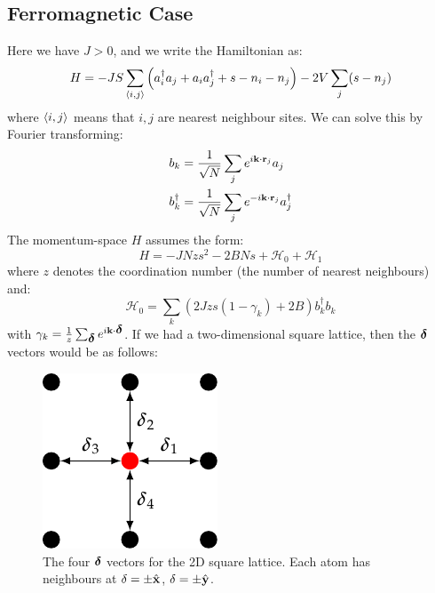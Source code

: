 \subsection{Ferromagnetic Case}
Here we have $J > 0$, and we write the Hamiltonian as:
\begin{equation}
    H = -JS\sum_{\left< i, j \right>}\left(a_i^\dagger a_j + a_i a_j^\dagger + s - n_i - n_j\right) - 2V\sum_j (s - n_j)
\end{equation}
where $\left< i, j \right>$ means that $i, j$ are nearest neighbour sites. We can solve this by Fourier transforming:
\begin{equation}
    \begin{split}
        b_k &= \frac{1}{\sqrt{N}}\sum_j e^{i\mathbf{k}\cdot \mathbf{r}_j}a_j
        \\ b_k^\dagger &= \frac{1}{\sqrt{N}}\sum_j e^{-i\mathbf{k}\cdot \mathbf{r}_j}a_j^\dagger
    \end{split}
\end{equation}
The momentum-space $H$ assumes the form:
\begin{equation}
    H = -JNzs^2 - 2BNs + \mathcal{H}_0 + \mathcal{H}_1
\end{equation}
where $z$ denotes the coordination number (the number of nearest neighbours) and:
\begin{equation}
    \mathcal{H}_0 = \sum_k \left(2Jzs(1 - \gamma_k) + 2B\right)b_k^\dag b_k
\end{equation}
with $\gamma_k = \frac{1}{z}\sum_{\mbox{\boldmath$ \delta $}}e^{i\mathbf{k}\cdot\mbox{\boldmath$ \delta $}}$. If we had a two-dimensional square lattice, then the $\mbox{\boldmath$ \delta $}$ vectors would be as follows:

\begin{figure}[htbp]
    \centering
    \includegraphics[]{Images/fig-2dsquarelatticedeltas.pdf}
   
    \caption{The four $\mbox{\boldmath$ \delta $}$ vectors for the 2D square lattice. Each atom has neighbours at $\delta = \pm \hat{\mathbf{x}}$, $\delta = \pm \hat{\mathbf{y}}$.}
    \label{fig-2dsquarelatticedeltas}
\end{figure}

